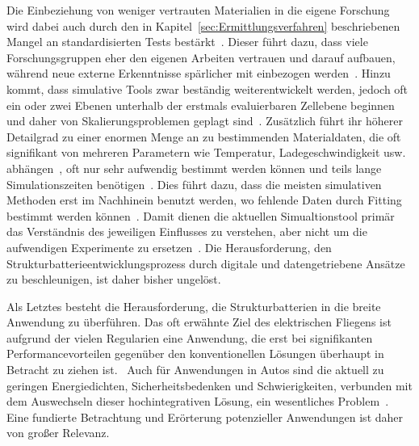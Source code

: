 Die Einbeziehung von weniger vertrauten Materialien in die eigene Forschung wird dabei auch durch den in Kapitel~\ref{sec:Ermittlungsverfahren} beschriebenen Mangel an standardisierten Tests bestärkt~\cite{Greenhalgh2024a}. Dieser führt dazu, dass viele Forschungsgruppen eher den eigenen Arbeiten vertrauen und darauf aufbauen, während neue externe Erkenntnisse spärlicher mit einbezogen werden~\cite{Greenhalgh2023, Greenhalgh2024a}. Hinzu kommt, dass simulative Tools zwar beständig weiterentwickelt werden, jedoch oft ein oder zwei Ebenen unterhalb der erstmals evaluierbaren Zellebene beginnen und daher von Skalierungsproblemen geplagt sind~\cite{Franco2019,Giessen2020}. Zusätzlich führt ihr höherer Detailgrad zu einer enormen Menge an zu bestimmenden Materialdaten, die oft signifikant von mehreren Parametern wie Temperatur, Ladegeschwindigkeit usw. abhängen~\cite{Duan2021,Carlstedt2022b}, oft nur sehr aufwendig bestimmt werden können und teils lange Simulationszeiten benötigen~\cite{Franco2019,Carlstedt2022}. Dies führt dazu, dass die meisten simulativen Methoden erst im Nachhinein benutzt werden, wo fehlende Daten durch Fitting bestimmt werden können~\cite{Carlstedt2022a, Carlstedt2023}. Damit dienen die aktuellen Simualtionstool primär das Verständnis des jeweiligen Einflusses zu verstehen, aber nicht um die aufwendigen Experimente zu ersetzen~\cite{Franco2013}. Die Herausforderung, den Strukturbatterieentwicklungsprozess durch digitale und datengetriebene Ansätze zu beschleunigen, ist daher bisher ungelöst.

Als Letztes besteht die Herausforderung, die Strukturbatterien in die breite Anwendung zu überführen. Das oft erwähnte Ziel des elektrischen Fliegens ist aufgrund der vielen Regularien eine Anwendung, die erst bei signifikanten Performancevorteilen gegenüber den konventionellen Lösungen überhaupt in Betracht zu ziehen ist.~\cite{Scholz2018,Schaefer2018,Ishfaq2022} Auch für Anwendungen in Autos sind die aktuell zu geringen Energiedichten, Sicherheitsbedenken und Schwierigkeiten, verbunden mit dem Auswechseln dieser hochintegrativen Lösung, ein wesentliches Problem~\cite{Kalnaus2021,Martins2021, Carlstedt2020a}. Eine fundierte Betrachtung und Erörterung potenzieller Anwendungen ist daher von großer Relevanz.

